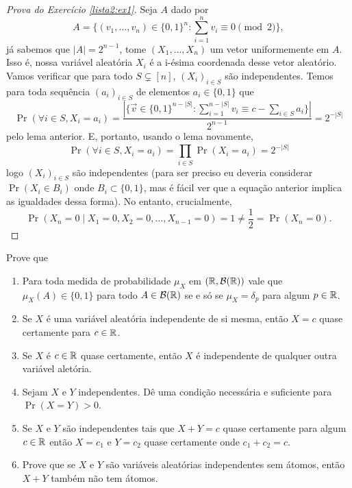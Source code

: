 \begin{proof}[ Prova do Exercício \ref{lista2:ex1}]
	Seja $A$ dado por
	\[
		A = \{(v_1, \dots, v_n) \in \{0,1\}^n : \sum_{i = 1}^n v_i \equiv 0 \pmod 2\},
	\]
	já sabemos que $|A| = 2^{n-1}$, tome $(X_1, \dots, X_n)$ um vetor
	uniformemente em $A$. Isso é, nossa variável aleatória $X_i$ é a
	i-ésima coordenada desse vetor aleatório.
	Vamos verificar que para todo $S \subsetneq [n]$, $(X_i)_{i \in S}$
	são independentes.
	Temos para toda sequência $(a_i)_{i \in S}$ de elementos $a_i \in \{0,1\}$ que
	\[
		\Pr(\forall i \in S,  X_i = a_i) = \frac{|\{\vec{v} \in \{0,
				1\}^{n-|S|}: \sum_{i=1}^{n-|S|} v_i \equiv c - \sum_{i \in S}
		a_i\}|}{2^{n-1}} = 2^{-|S|}
	\]
	pelo lema anterior. E, portanto, usando o lema novamente,
	\[
		\Pr(\forall i \in S,  X_i = a_i) = \prod_{i \in S}^{}\Pr(X_i = a_i) = 2^{-|S|}
	\]
	logo $(X_i)_{i \in S}$ são independentes (para ser preciso eu
		deveria considerar $\Pr(X_i \in B_i)$ onde $B_i \subset \{0,1\}$,
		mas é fácil ver que a equação anterior implica as igualdades dessa
	forma). No entanto, crucialmente,
	\[
		\Pr(X_n = 0 \; |\; X_1 = 0, X_2 = 0, \dots, X_{n-1} = 0) = 1 \neq
		\frac{1}{2} = \Pr(X_n = 0).
	\]
\end{proof}

\begin{exercise}
	Prove que
	\begin{enumerate}[label=(\alph*)]
		\item Para toda medida de probabilidade $\mu_X$ em $(\mathbb{R},
			\mathcal{B}(\mathbb{R}))$ vale que $\mu_X(A) \in \{0,1\}$ para
			todo $A \in \mathcal{B}(\mathbb{R})$ se e só se $\mu_X = \delta_p$ para
			algum $p \in \mathbb{R}$.
		\item Se $X$ é uma variável aleatória independente de si mesma,
			então $X = c$ quase certamente para $c \in \mathbb{R}$.
		\item Se $X$ é $c \in \mathbb{R}$ quase certamente, então $X$ é
			independente de qualquer outra variável aletória.
		\item Sejam $X$ e $Y$ independentes. Dê uma condição necessária e
			suficiente para $\Pr(X = Y) > 0$.
		\item Se $X$ e $Y$ são independentes tais que $X + Y = c$ quase
			certamente para algum $c \in \mathbb{R}$
			então $X = c_1$ e $Y = c_2$ quase certamente onde $c_1 + c_2 = c$.
		\item Prove que se $X$ e $Y$ são variáveis aleatórias independentes
			sem átomos, então $X + Y$ também não tem átomos.
	\end{enumerate}
\end{exercise}

